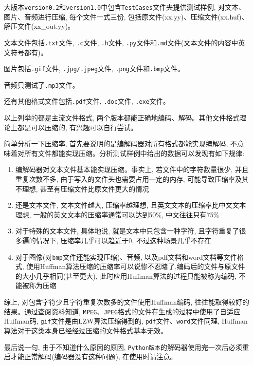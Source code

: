 \documentclass{ctexart}
\begin{document}
大版本\texttt{version0.2}和\texttt{version1.0}中包含\texttt{TestCases}文件夹提供测试样例, 对文本、图片、音频进行压缩, 每个文件一式三份, 包括原文件(xx.yy)、压缩文件(xx.huf)、解压文件(xx\_out.yy)。

文本文件包括\texttt{.txt}文件, \texttt{.c}文件, \texttt{.h}文件, \texttt{.py}文件和\texttt{.md}文件(文本文件的内容中英文符号都有)。

图片包括\texttt{.gif}文件, \texttt{.jpg/.jpeg}文件, \texttt{.png}文件和\texttt{.bmp}文件。

音频只测试了\texttt{.mp3}文件。

还有其他格式文件包括\texttt{.pdf}文件, \texttt{.doc}文件, \texttt{.exe}文件。

以上列举的都是主流文件格式, 两个版本都能正确地编码、解码。其他文件格式理论上都是可以压缩的, 有兴趣可以自行尝试。

简单分析一下压缩率, 首先要说明的是编解码器对所有格式都能实现编解码, 不意味着对所有文件都能实现压缩。分析测试样例中给出的数据可以发现有如下规律:

\begin{enumerate}
\def\labelenumi{\arabic{enumi}.}
\item
  编解码器对文本文件基本能实现压缩。事实上, 若文件中的字符数量很少, 并且重复次数不多, 由于写入的文件头也需要占用一定的内存, 可能导致压缩率及其不理想, 甚至有压缩文件比原文件更大的情况
\item
  还是文本文件, 文本文件越大, 压缩率越理想, 且英文文本的压缩率比中文文本理想, 一般的英文文本的压缩率通常可以达到50\%, 中文往往只有75\%
\item
  对于特殊的文本文件, 具体地说, 就是文本中只包含一种字符, 且字符重复了很多遍的情况下, 压缩率几乎可以趋近于0, 不过这种场景几乎不存在
\item
  对于图像(对\texttt{bmp}文件还能实现压缩)、音频, 以及pdf文档和word文档等文件格式, 使用Huffman算法压缩的压缩率可以说惨不忍睹了,编码后的文件与原文件的大小几乎相同(甚至更大), 此时应用Huffman算法的过程只能被称为编码, 不能被称为压缩
\end{enumerate}

综上, 对包含字符少且字符重复次数多的文件使用Huffman编码, 往往能取得较好的结果。通过查阅资料知道,
\texttt{MPEG}、\texttt{JPEG}格式的文件在生成的过程中使用了自适应Huffman码, \texttt{gif}文件是由LZW算法压缩得到的, \texttt{pdf}文件、\texttt{word}文件同理, Huffman算法对于这类本身已经经过压缩的文件格式基本无效。

最后说一句, 由于不知道什么原因的原因, \texttt{Python版本}的解码器使用完一次后必须重启才能正常解码(编码器没有这种问题), 在使用时请注意。
\end{document}
